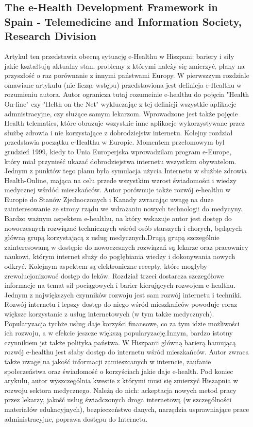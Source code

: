 \documentclass[a4paper,10pt]{article}
\begin{document}
\subsection {The e-Health Development Framework in Spain - Telemedicine and Information Society, Research Division}
Artykuł ten przedstawia obecną sytuację e-Healthu w Hiszpani: bariery i siły jakie kształtują aktualny stan, problemy z którymi należy się zmierzyć, plany na przyszłość o raz porównanie z innymi państwami Europy. W pierwszzym rozdziale omawiane artykułu (nie licząc wstępu) przedstawiona jest definicja e-Healthu w rozumieniu autora. Autor ogranicza tutaj rozumeinie e-healthu do pojęcia "Health On-line" czy "Helth on the Net" wykluczając z tej definicji wszystkie aplikacje admnistracyjne, czy służące samym lekarzom. Wprowadzone jest także pojęcie Health telematics, które obrazuje wszystkie inne aplikacje wykorzystywane przez służbę zdrowia i nie korzystające z dobrodziejstw internetu.
Kolejny rozdział przedstawia początku e-Healthu w Europie. Momentem przełomowym byl grudzień 1999, kiedy to Unia Europerjska wprowadzilam program e-Europe, który miał przynieść ukazać dobrodziejstwa
internetu wszystkim obywatelom. Jednym z punktów tego planu była symulacja użycia Internetu w służbie zdrowia Health-Online, mająca na celu przede wszystkim wzrost świadomości i wiedzy medycznej
wśrdód mieszkańców. Autor porównuje także rozwój e-healthu w Europie do Stanów Zjednoczonych i Kanady zwracając uwagę na duże zainteresowanie ze strony rządu we wdrażaniu nowych technologii do medycyny.
Bardzo ważnym aspektem e-healthu, na który wskazuje autor jest dostęp do nowoczesnych rozwiązać technicznych wśród osób starszych i chorych, będących główną grupą korzystającą z usług medycznych.Drugą grupą
szczególnie zainteresowaną w dostępie do nowoczesnych rozwiązań są lekarze oraz pracownicy naukowi, którym internet służy do pogłębiania wiedzy i dokonywania nowych odkryć. Kolejnym aspektem
są elektroniczne recepty, które mogłyby zrewolucjonizować dostęp do leków.
Rozdział trzeci dostarcza szczegółowe informacje na temat sił pociągowych i barier kierujących rozwojem e-healthu. Jednym z największych czynników rozwoju jest sam rozwój internetu i techniki.
Rozwój internetu i lepszy dostęp do niego wśród mieszkańców powoduje coraz większe korzystanie z usług internetowych (w tym także medycznych). Popularyzacja tychże usług daje korzyści finansowe, 
co za tym idzie możliwości ich rozwoju, a w efekcie jeszcze większą popularyzację.Innym, bardzo istotny czynnikiem jst także polityka państwa. W Hiszpanii główną barierą hamującą rozwój
e-healthu jest słaby dostęp do internetu wśród mieszkańców. Autor zwraca także uwage na jakość informacji zamieszcanych w interncie, zaufanie społeczeństwa oraz świadomość o korzyściach jakie daje
e-health. Pod koniec arykułu, autor wyszczególnia kwestie z którymi musi się zmierzyć Hiszapnia w rozwoju sektora medycznego. Należą do nich: ackeptacja nowych metod pracy przez lekarzy, jakość
usług świadczonych droga internetową (w szczególności materiałów edukacyjnych), bezpieczeństwo danych, narzędzia usprawniające prace administracyjne, poprawa dostępu do Internetu.
\end{document}
